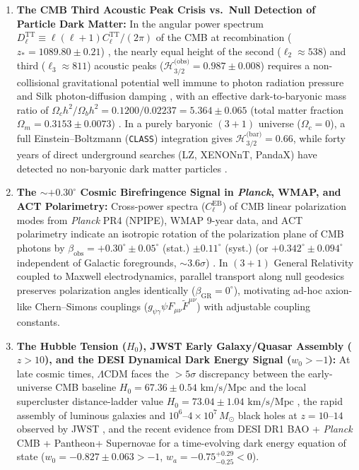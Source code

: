 \documentclass[11pt,a4paper]{article}
\theoremstyle{plain}
\theoremstyle{definition}
\theoremstyle{remark}
\numberwithin{equation}{section}
\begin{document}
\begin{enumerate}
    \item \textbf{The CMB Third Acoustic Peak Crisis vs.\ Null Detection of Particle Dark Matter:} In the angular power spectrum $D_\ell^{\text{TT}} \equiv \ell(\ell+1)C_\ell^{\text{TT}}/(2\pi)$ of the CMB at recombination ($z_* = 1089.80 \pm 0.21$) \cite{planck2018_vi,hu1995}, the nearly equal height of the second ($\ell_2 \approx 538$) and third ($\ell_3 \approx 811$) acoustic peaks ($\mathcal{H}_{3/2}^{\text{(obs)}} = 0.987 \pm 0.008$) requires a non-collisional gravitational potential well immune to photon radiation pressure and Silk photon-diffusion damping \cite{silk1968}, with an effective dark-to-baryonic mass ratio of $\Omega_c h^2 / \Omega_b h^2 = 0.1200 / 0.02237 = 5.364 \pm 0.065$ (total matter fraction $\Omega_m = 0.3153 \pm 0.0073$) \cite{planck2018_vi}. In a purely baryonic $(3+1)$ universe ($\Omega_c = 0$), a full Einstein--Boltzmann (\texttt{CLASS}) integration gives $\mathcal{H}_{3/2}^{\text{(bar)}} = 0.66$, while forty years of direct underground searches (LZ, XENONnT, PandaX) have detected no non-baryonic dark matter particles \cite{skordis2006,skordis2021}.

    \item \textbf{The $\sim +0.30^\circ$ Cosmic Birefringence Signal in \textit{Planck}, WMAP, and ACT Polarimetry:} Cross-power spectra ($C_\ell^{\text{EB}}$) of CMB linear polarization modes from \textit{Planck} PR4 (NPIPE), WMAP 9-year data, and ACT polarimetry indicate an isotropic rotation of the polarization plane of CMB photons by $\beta_{\text{obs}} = +0.30^\circ \pm 0.05^\circ$ (stat.) $\pm 0.11^\circ$ (syst.) (or $+0.342^\circ \pm 0.094^\circ$ independent of Galactic foregrounds, $\sim 3.6\sigma$) \cite{minami2020,diego2022,eskilt2022,komatsu2022}. In $(3+1)$ General Relativity coupled to Maxwell electrodynamics, parallel transport along null geodesics preserves polarization angles identically ($\beta_{\text{GR}} = 0^\circ$), motivating ad-hoc axion-like Chern--Simons couplings ($g_{\psi\gamma}\psi F_{\mu\nu}\tilde{F}^{\mu\nu}$) with adjustable coupling constants.

    \item \textbf{The Hubble Tension ($H_0$), JWST Early Galaxy/Quasar Assembly ($z > 10$), and the DESI Dynamical Dark Energy Signal ($w_0 > -1$):} At late cosmic times, $\Lambda\text{CDM}$ faces the $>5\sigma$ discrepancy between the early-universe CMB baseline $H_0 = 67.36 \pm 0.54\text{ km/s/Mpc}$ \cite{planck2018_vi} and the local supercluster distance-ladder value $H_0 = 73.04 \pm 1.04\text{ km/s/Mpc}$ \cite{riess2022}, the rapid assembly of luminous galaxies and $10^6\text{--}4\times 10^7\,M_\odot$ black holes at $z = 10\text{--}14$ observed by JWST \cite{bogdan2024,maiolino2024,carniani2024}, and the recent evidence from DESI DR1 BAO + \textit{Planck} CMB + Pantheon+ Supernovae \cite{desi2024_vi} for a time-evolving dark energy equation of state ($w_0 = -0.827 \pm 0.063 > -1$, $w_a = -0.75^{+0.29}_{-0.25} < 0$).
\end{enumerate}
\end{document}
